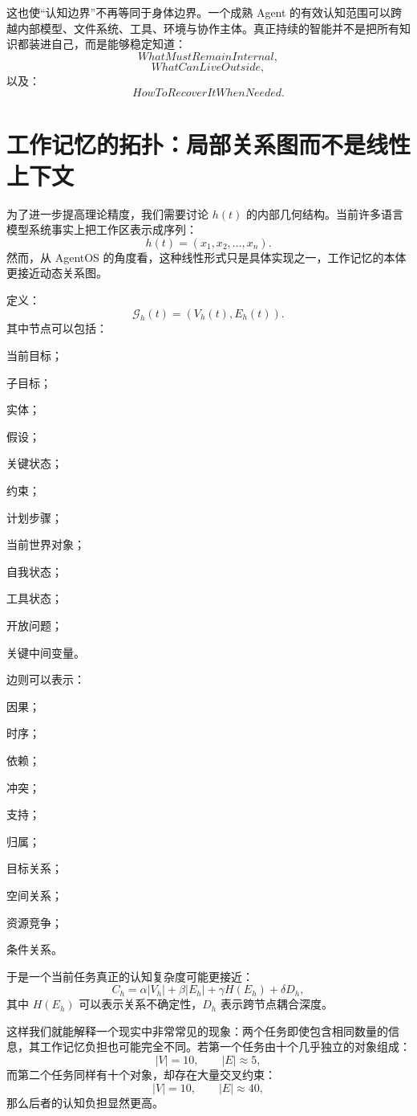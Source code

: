 这也使“认知边界”不再等同于身体边界。一个成熟 Agent 的有效认知范围可以跨越内部模型、文件系统、工具、环境与协作主体。真正持续的智能并不是把所有知识都装进自己，而是能够稳定知道：
\[
WhatMustRemainInternal,
\]
\[
WhatCanLiveOutside,
\]
以及：
\[
HowToRecoverItWhenNeeded.
\]

\section{工作记忆的拓扑：局部关系图而不是线性上下文}

为了进一步提高理论精度，我们需要讨论 $h(t)$ 的内部几何结构。当前许多语言模型系统事实上把工作区表示成序列：
\[
h(t)
=
(x_1,x_2,\dots,x_n).
\]
然而，从 AgentOS 的角度看，这种线性形式只是具体实现之一，工作记忆的本体更接近动态关系图。

定义：
\[
\mathcal G_h(t)
=
\left(
V_h(t),
E_h(t)
\right).
\]
其中节点可以包括：

当前目标；

子目标；

实体；

假设；

关键状态；

约束；

计划步骤；

当前世界对象；

自我状态；

工具状态；

开放问题；

关键中间变量。

边则可以表示：

因果；

时序；

依赖；

冲突；

支持；

归属；

目标关系；

空间关系；

资源竞争；

条件关系。

于是一个当前任务真正的认知复杂度可能更接近：
\[
C_h
=
\alpha |V_h|
+
\beta |E_h|
+
\gamma H(E_h)
+
\delta D_h,
\]
其中 $H(E_h)$ 可以表示关系不确定性，$D_h$ 表示跨节点耦合深度。

这样我们就能解释一个现实中非常常见的现象：两个任务即使包含相同数量的信息，其工作记忆负担也可能完全不同。若第一个任务由十个几乎独立的对象组成：
\[
|V|=10,\qquad |E|\approx 5,
\]
而第二个任务同样有十个对象，却存在大量交叉约束：
\[
|V|=10,\qquad |E|\approx40,
\]
那么后者的认知负担显然更高。

